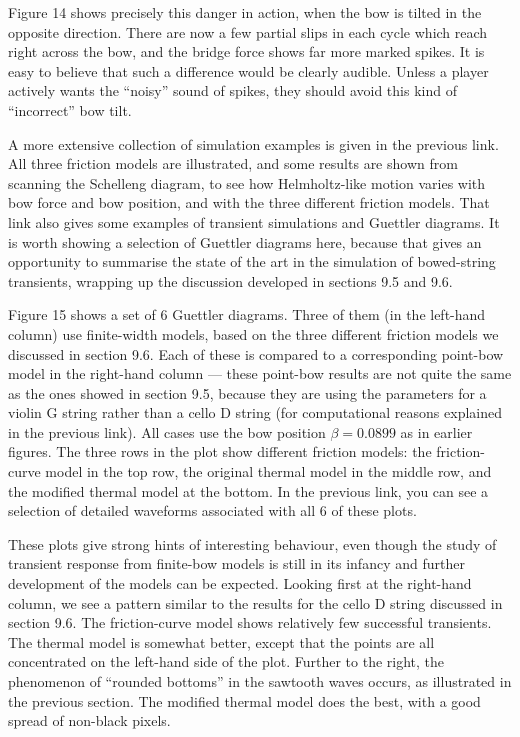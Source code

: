   Figure 14 shows precisely this danger in action, when the bow is tilted in 
  the opposite direction. There are now a few partial slips in each cycle which 
  reach right across the bow, and the bridge force shows far more marked 
  spikes. It is easy to believe that such a difference would be clearly 
  audible. Unless a player actively wants the “noisy” sound of spikes, they 
  should avoid this kind of “incorrect” bow tilt. 

  A more extensive collection of simulation examples is given in the previous 
  link. All three friction models are illustrated, and some results are shown 
  from scanning the Schelleng diagram, to see how Helmholtz-like motion varies 
  with bow force and bow position, and with the three different friction 
  models. That link also gives some examples of transient simulations and 
  Guettler diagrams. It is worth showing a selection of Guettler diagrams here, 
  because that gives an opportunity to summarise the state of the art in the 
  simulation of bowed-string transients, wrapping up the discussion developed 
  in sections 9.5 and 9.6. 

  Figure 15 shows a set of 6 Guettler diagrams. Three of them (in the left-hand 
  column) use finite-width models, based on the three different friction models 
  we discussed in section 9.6. Each of these is compared to a corresponding 
  point-bow model in the right-hand column — these point-bow results are not 
  quite the same as the ones showed in section 9.5, because they are using the 
  parameters for a violin G string rather than a cello D string (for 
  computational reasons explained in the previous link). All cases use the bow 
  position $\beta = 0.0899$ as in earlier figures. The three rows in the plot 
  show different friction models: the friction-curve model in the top row, the 
  original thermal model in the middle row, and the modified thermal model at 
  the bottom. In the previous link, you can see a selection of detailed 
  waveforms associated with all 6 of these plots. 







  These plots give strong hints of interesting behaviour, even though the study 
  of transient response from finite-bow models is still in its infancy and 
  further development of the models can be expected. Looking first at the 
  right-hand column, we see a pattern similar to the results for the cello D 
  string discussed in section 9.6. The friction-curve model shows relatively 
  few successful transients. The thermal model is somewhat better, except that 
  the points are all concentrated on the left-hand side of the plot. Further to 
  the right, the phenomenon of “rounded bottoms” in the sawtooth waves occurs, 
  as illustrated in the previous section. The modified thermal model does the 
  best, with a good spread of non-black pixels. 

